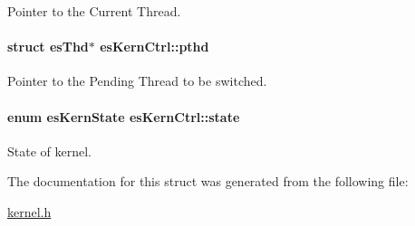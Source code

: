 Pointer to the Current Thread. 

\hypertarget{structesKernCtrl_a0c4ca292be0d70bfdf7f89a19ff49ca8}{
\paragraph[{pthd}]{\setlength{\rightskip}{0pt plus 5cm}struct {\bf es\-Thd}$\ast$ es\-Kern\-Ctrl\-::pthd}}\label{structesKernCtrl_a0c4ca292be0d70bfdf7f89a19ff49ca8}


Pointer to the Pending Thread to be switched. 

\hypertarget{structesKernCtrl_a148e7bb788d355ad3799713fda612a4e}{
\paragraph[{state}]{\setlength{\rightskip}{0pt plus 5cm}enum {\bf es\-Kern\-State} es\-Kern\-Ctrl\-::state}}\label{structesKernCtrl_a148e7bb788d355ad3799713fda612a4e}


State of kernel. 



The documentation for this struct was generated from the following file\-:\begin{DoxyCompactItemize}
\item 
\hyperlink{kernel_8h}{kernel.\-h}\end{DoxyCompactItemize}
